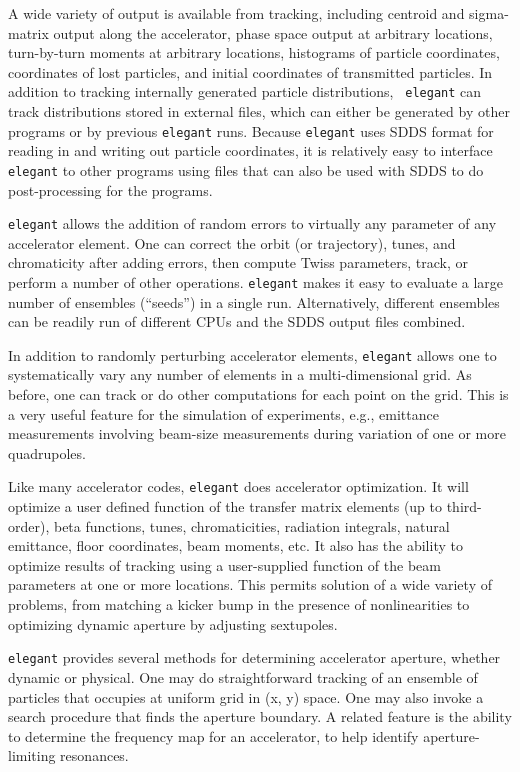 \documentclass[11pt]{article}
\begin{document}
A wide variety of output is available from tracking, including
centroid and sigma-matrix output along the accelerator, phase space
output at arbitrary locations, turn-by-turn moments at arbitrary
locations, histograms of particle coordinates, coordinates of lost
particles, and initial coordinates of transmitted particles.  In
addition to tracking internally generated particle distributions, {\tt
elegant} can track distributions stored in external files, which can
either be generated by other programs or by previous {\tt elegant}
runs.  Because {\tt elegant} uses SDDS format for reading in and
writing out particle coordinates, it is relatively easy to interface
{\tt elegant} to other programs using files that can also be used with
SDDS to do post-processing for the programs.

{\tt elegant} allows the addition of random errors to virtually any
parameter of any accelerator element.  One can correct the orbit (or
trajectory), tunes, and chromaticity after adding errors, then compute
Twiss parameters, track, or perform a number of other operations.
{\tt elegant} makes it easy to evaluate a large number of ensembles (``seeds'')
in a single run.  Alternatively, different ensembles can be readily run
of different CPUs and the SDDS output files combined.

In addition to randomly perturbing accelerator elements, {\tt elegant}
allows one to systematically vary any number of elements in a
multi-dimensional grid.  As before, one can track or do other
computations for each point on the grid.  This is a very useful
feature for the simulation of experiments, e.g., emittance
measurements involving beam-size measurements during variation of one
or more quadrupoles\cite{Borland_PC}.

Like many accelerator codes, {\tt elegant} does accelerator
optimization.  It will optimize a user defined function of the
transfer matrix elements (up to third-order), beta functions, tunes,
chromaticities, radiation integrals, natural emittance, floor
coordinates, beam moments, etc.  It also has the ability to optimize results of
tracking using a user-supplied function of the beam parameters at one
or more locations.  This permits solution of a wide variety of
problems, from matching a kicker bump in the presence of
nonlinearities to optimizing dynamic aperture by adjusting sextupoles.

{\tt elegant} provides several methods for determining accelerator
aperture, whether dynamic or physical.  One may do straightforward
tracking of an ensemble of particles that occupies at uniform grid in
(x, y) space.  One may also invoke a search procedure that finds the
aperture boundary.  A related feature is the ability to determine
the frequency map for an accelerator, to help identify aperture-limiting
resonances.
\end{document}
